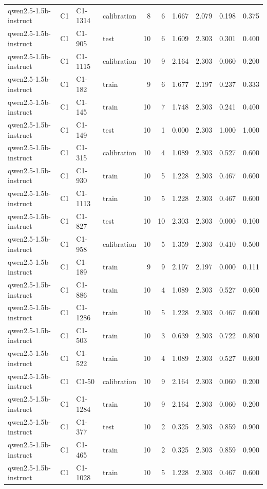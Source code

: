 \begin{table}
\begin{tabular}{llllrrrrrr}
qwen2.5-1.5b-instruct & C1 & C1-1314 & calibration & 8 & 6 & 1.667 & 2.079 & 0.198 & 0.375 \\
qwen2.5-1.5b-instruct & C1 & C1-905 & test & 10 & 6 & 1.609 & 2.303 & 0.301 & 0.400 \\
qwen2.5-1.5b-instruct & C1 & C1-1115 & calibration & 10 & 9 & 2.164 & 2.303 & 0.060 & 0.200 \\
qwen2.5-1.5b-instruct & C1 & C1-182 & train & 9 & 6 & 1.677 & 2.197 & 0.237 & 0.333 \\
qwen2.5-1.5b-instruct & C1 & C1-145 & train & 10 & 7 & 1.748 & 2.303 & 0.241 & 0.400 \\
qwen2.5-1.5b-instruct & C1 & C1-149 & test & 10 & 1 & 0.000 & 2.303 & 1.000 & 1.000 \\
qwen2.5-1.5b-instruct & C1 & C1-315 & calibration & 10 & 4 & 1.089 & 2.303 & 0.527 & 0.600 \\
qwen2.5-1.5b-instruct & C1 & C1-930 & train & 10 & 5 & 1.228 & 2.303 & 0.467 & 0.600 \\
qwen2.5-1.5b-instruct & C1 & C1-1113 & train & 10 & 5 & 1.228 & 2.303 & 0.467 & 0.600 \\
qwen2.5-1.5b-instruct & C1 & C1-827 & test & 10 & 10 & 2.303 & 2.303 & 0.000 & 0.100 \\
qwen2.5-1.5b-instruct & C1 & C1-958 & calibration & 10 & 5 & 1.359 & 2.303 & 0.410 & 0.500 \\
qwen2.5-1.5b-instruct & C1 & C1-189 & train & 9 & 9 & 2.197 & 2.197 & 0.000 & 0.111 \\
qwen2.5-1.5b-instruct & C1 & C1-886 & train & 10 & 4 & 1.089 & 2.303 & 0.527 & 0.600 \\
qwen2.5-1.5b-instruct & C1 & C1-1286 & train & 10 & 5 & 1.228 & 2.303 & 0.467 & 0.600 \\
qwen2.5-1.5b-instruct & C1 & C1-503 & train & 10 & 3 & 0.639 & 2.303 & 0.722 & 0.800 \\
qwen2.5-1.5b-instruct & C1 & C1-522 & train & 10 & 4 & 1.089 & 2.303 & 0.527 & 0.600 \\
qwen2.5-1.5b-instruct & C1 & C1-50 & calibration & 10 & 9 & 2.164 & 2.303 & 0.060 & 0.200 \\
qwen2.5-1.5b-instruct & C1 & C1-1284 & train & 10 & 9 & 2.164 & 2.303 & 0.060 & 0.200 \\
qwen2.5-1.5b-instruct & C1 & C1-377 & test & 10 & 2 & 0.325 & 2.303 & 0.859 & 0.900 \\
qwen2.5-1.5b-instruct & C1 & C1-465 & train & 10 & 2 & 0.325 & 2.303 & 0.859 & 0.900 \\
qwen2.5-1.5b-instruct & C1 & C1-1028 & train & 10 & 5 & 1.228 & 2.303 & 0.467 & 0.600 \\

\end{tabular}
\end{table}
